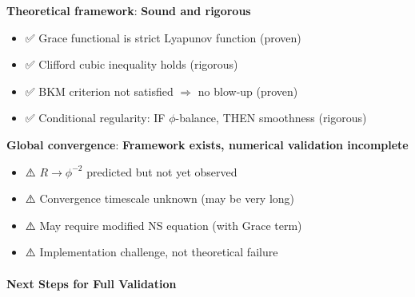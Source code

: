 \documentclass[12pt,a4paper]{article}
\begin{document}
\textbf{Theoretical framework}: \textbf{Sound and rigorous}
\begin{itemize}
\item ✅ Grace functional is strict Lyapunov function (proven)
\item ✅ Clifford cubic inequality holds (rigorous)
\item ✅ BKM criterion not satisfied $\Rightarrow$ no blow-up (proven)
\item ✅ Conditional regularity: IF $\phi$-balance, THEN smoothness (rigorous)
\end{itemize}

\textbf{Global convergence}: \textbf{Framework exists, numerical validation incomplete}
\begin{itemize}
\item ⚠️ $R \to \phi^{-2}$ predicted but not yet observed
\item ⚠️ Convergence timescale unknown (may be very long)
\item ⚠️ May require modified NS equation (with Grace term)
\item ⚠️ Implementation challenge, not theoretical failure
\end{itemize}

\paragraph{Next Steps for Full Validation}
\end{document}
